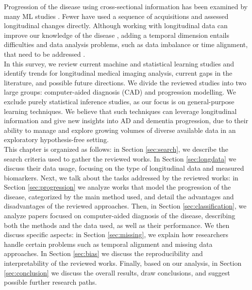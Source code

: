 Progression of the disease using cross-sectional information has been examined by many ML studies \cite{Oxtoby2017,Acharya2019}. Fewer have used a sequence of acquisitions and assessed longitudinal changes directly. Although working with longitudinal data can improve our knowledge of the disease \cite{Xu2014}, adding a temporal dimension entails difficulties and data analysis problems, such as data imbalance or time alignment, that need to be addressed \cite{Fitzmaurice2008,Ibrahim}. \\

In this survey, we review current machine and statistical learning studies and identify trends for longitudinal medical imaging analysis, current gaps in the literature, and possible future directions. We divide the reviewed studies into two large groups: computer-aided diagnosis (CAD) and progression modelling. We exclude purely statistical inference studies, as our focus is on general-purpose learning techniques. We believe that such techniques can leverage longitudinal information and give new insights into AD and dementia progression, due to their ability to manage and explore growing volumes of diverse available data in an exploratory hypothesis-free setting.\\


This chapter is organized as follows: in Section \ref{sec:search}, we describe the search criteria used to gather the reviewed works. In Section \ref{sec:longdata} we discuss their data usage, focusing on the type of longitudinal data and measured biomarkers. Next, we talk about the tasks addressed by the reviewed works: in Section \ref{sec:progression} we analyze works that model the progression of the disease, categorized by the main method used, and detail the advantages and disadvantages of the reviewed approaches. Then, in Section \ref{sec:classification}, we analyze papers focused on computer-aided diagnosis of the disease, describing both the methods and the data used, as well as their performance. We then discuss specific aspects: in Section \ref{sec:missing}, we explain how researchers handle certain problems such as temporal alignment and missing data approaches. In Section \ref{sec:bias} we discuss the reproducibility and interpretability of the reviewed works. Finally, based on our analysis, in Section \ref{sec:conclusion} we discuss the overall results, draw conclusions, and suggest possible further research paths. \\

